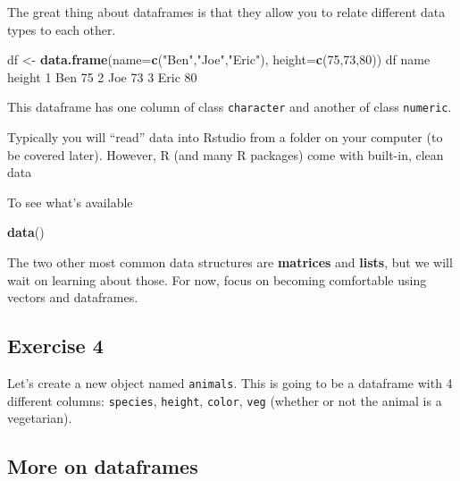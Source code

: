 \documentclass[
]{book}
\newenvironment{Shaded}{\begin{snugshade}}{\end{snugshade}}
\newcommand{\DataTypeTok}[1]{\textcolor[rgb]{0.13,0.29,0.53}{#1}}
\newcommand{\DecValTok}[1]{\textcolor[rgb]{0.00,0.00,0.81}{#1}}
\newcommand{\KeywordTok}[1]{\textcolor[rgb]{0.13,0.29,0.53}{\textbf{#1}}}
\newcommand{\NormalTok}[1]{#1}
\newcommand{\StringTok}[1]{\textcolor[rgb]{0.31,0.60,0.02}{#1}}
\begin{document}
The great thing about dataframes is that they allow you to relate different data types to each other.

\begin{Shaded}
\begin{Highlighting}[]
\NormalTok{df <-}\StringTok{ }\KeywordTok{data.frame}\NormalTok{(}\DataTypeTok{name=}\KeywordTok{c}\NormalTok{(}\StringTok{"Ben"}\NormalTok{,}\StringTok{"Joe"}\NormalTok{,}\StringTok{"Eric"}\NormalTok{),}
                 \DataTypeTok{height=}\KeywordTok{c}\NormalTok{(}\DecValTok{75}\NormalTok{,}\DecValTok{73}\NormalTok{,}\DecValTok{80}\NormalTok{))}
\NormalTok{df}
\NormalTok{  name height}
\DecValTok{1}\NormalTok{  Ben     }\DecValTok{75}
\DecValTok{2}\NormalTok{  Joe     }\DecValTok{73}
\DecValTok{3}\NormalTok{ Eric     }\DecValTok{80}
\end{Highlighting}
\end{Shaded}

This dataframe has one column of class \texttt{character} and another of class \texttt{numeric}.

Typically you will ``read'' data into Rstudio from a folder on your computer (to be covered later). However, R (and many R packages) come with built-in, clean data

To see what's available

\begin{Shaded}
\begin{Highlighting}[]
\KeywordTok{data}\NormalTok{()}
\end{Highlighting}
\end{Shaded}

The two other most common data structures are \textbf{matrices} and \textbf{lists}, but we will wait on learning about those. For now, focus on becoming comfortable using vectors and dataframes.

\hypertarget{exercise-4-2}{%
\subsection*{Exercise 4}\label{exercise-4-2}}

Let's create a new object named \texttt{animals}. This is going to be a dataframe with 4 different columns: \texttt{species}, \texttt{height}, \texttt{color}, \texttt{veg} (whether or not the animal is a vegetarian).

\hypertarget{more-on-dataframes}{%
\subsection{More on dataframes}\label{more-on-dataframes}}
\end{document}
